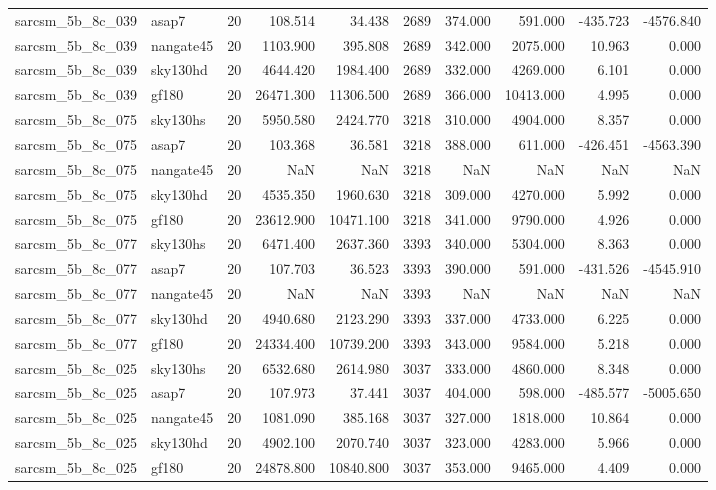 \begin{tabular}{llrrrrrrrr}
sarcsm\_5b\_8c\_039 & asap7 & 20 & 108.514 & 34.438 & 2689 & 374.000 & 591.000 & -435.723 & -4576.840 \\
sarcsm\_5b\_8c\_039 & nangate45 & 20 & 1103.900 & 395.808 & 2689 & 342.000 & 2075.000 & 10.963 & 0.000 \\
sarcsm\_5b\_8c\_039 & sky130hd & 20 & 4644.420 & 1984.400 & 2689 & 332.000 & 4269.000 & 6.101 & 0.000 \\
sarcsm\_5b\_8c\_039 & gf180 & 20 & 26471.300 & 11306.500 & 2689 & 366.000 & 10413.000 & 4.995 & 0.000 \\
sarcsm\_5b\_8c\_075 & sky130hs & 20 & 5950.580 & 2424.770 & 3218 & 310.000 & 4904.000 & 8.357 & 0.000 \\
sarcsm\_5b\_8c\_075 & asap7 & 20 & 103.368 & 36.581 & 3218 & 388.000 & 611.000 & -426.451 & -4563.390 \\
sarcsm\_5b\_8c\_075 & nangate45 & 20 & NaN & NaN & 3218 & NaN & NaN & NaN & NaN \\
sarcsm\_5b\_8c\_075 & sky130hd & 20 & 4535.350 & 1960.630 & 3218 & 309.000 & 4270.000 & 5.992 & 0.000 \\
sarcsm\_5b\_8c\_075 & gf180 & 20 & 23612.900 & 10471.100 & 3218 & 341.000 & 9790.000 & 4.926 & 0.000 \\
sarcsm\_5b\_8c\_077 & sky130hs & 20 & 6471.400 & 2637.360 & 3393 & 340.000 & 5304.000 & 8.363 & 0.000 \\
sarcsm\_5b\_8c\_077 & asap7 & 20 & 107.703 & 36.523 & 3393 & 390.000 & 591.000 & -431.526 & -4545.910 \\
sarcsm\_5b\_8c\_077 & nangate45 & 20 & NaN & NaN & 3393 & NaN & NaN & NaN & NaN \\
sarcsm\_5b\_8c\_077 & sky130hd & 20 & 4940.680 & 2123.290 & 3393 & 337.000 & 4733.000 & 6.225 & 0.000 \\
sarcsm\_5b\_8c\_077 & gf180 & 20 & 24334.400 & 10739.200 & 3393 & 343.000 & 9584.000 & 5.218 & 0.000 \\
sarcsm\_5b\_8c\_025 & sky130hs & 20 & 6532.680 & 2614.980 & 3037 & 333.000 & 4860.000 & 8.348 & 0.000 \\
sarcsm\_5b\_8c\_025 & asap7 & 20 & 107.973 & 37.441 & 3037 & 404.000 & 598.000 & -485.577 & -5005.650 \\
sarcsm\_5b\_8c\_025 & nangate45 & 20 & 1081.090 & 385.168 & 3037 & 327.000 & 1818.000 & 10.864 & 0.000 \\
sarcsm\_5b\_8c\_025 & sky130hd & 20 & 4902.100 & 2070.740 & 3037 & 323.000 & 4283.000 & 5.966 & 0.000 \\
sarcsm\_5b\_8c\_025 & gf180 & 20 & 24878.800 & 10840.800 & 3037 & 353.000 & 9465.000 & 4.409 & 0.000 \\

\end{tabular}
